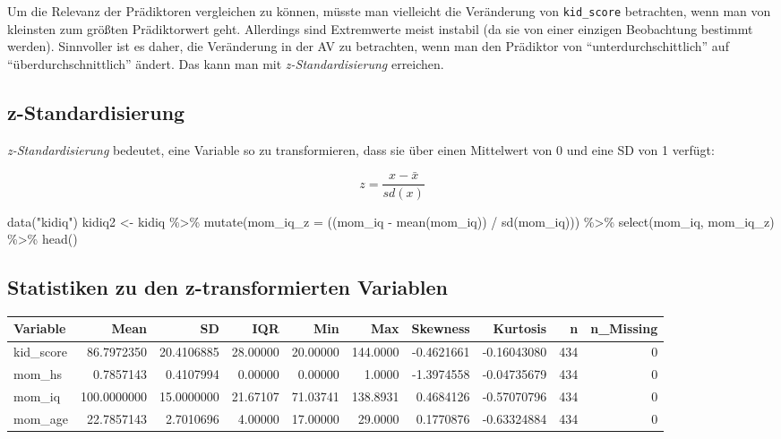\documentclass[
  a4paper,
  DIV=11]{scrreprt}
\newenvironment{Shaded}{\begin{snugshade}}{\end{snugshade}}
\newcommand{\AttributeTok}[1]{\textcolor[rgb]{0.40,0.45,0.13}{#1}}
\newcommand{\FunctionTok}[1]{\textcolor[rgb]{0.28,0.35,0.67}{#1}}
\newcommand{\NormalTok}[1]{\textcolor[rgb]{0.00,0.23,0.31}{#1}}
\newcommand{\OtherTok}[1]{\textcolor[rgb]{0.00,0.23,0.31}{#1}}
\newcommand{\SpecialCharTok}[1]{\textcolor[rgb]{0.37,0.37,0.37}{#1}}
\newcommand{\StringTok}[1]{\textcolor[rgb]{0.13,0.47,0.30}{#1}}
\theoremstyle{definition}
\theoremstyle{remark}
\begin{document}
Um die Relevanz der Prädiktoren vergleichen zu können, müsste man
vielleicht die Veränderung von \texttt{kid\_score} betrachten, wenn man
von kleinsten zum größten Prädiktorwert geht. Allerdings sind
Extremwerte meist instabil (da sie von einer einzigen Beobachtung
bestimmt werden). Sinnvoller ist es daher, die Veränderung in der AV zu
betrachten, wenn man den Prädiktor von ``unterdurchschittlich'' auf
``überdurchschnittlich'' ändert. Das kann man mit
\emph{z-Standardisierung} erreichen.

\hypertarget{z-standardisierung}{%
\subsection{z-Standardisierung}\label{z-standardisierung}}

\emph{z-Standardisierung} bedeutet, eine Variable so zu transformieren,
dass sie über einen Mittelwert von 0 und eine SD von 1 verfügt:

\[z = \frac{x - \bar{x}}{sd(x)}\]

\begin{Shaded}
\begin{Highlighting}[]
\FunctionTok{data}\NormalTok{(}\StringTok{"kidiq"}\NormalTok{)}
\NormalTok{kidiq2 }\OtherTok{\textless{}{-}} 
\NormalTok{  kidiq }\SpecialCharTok{\%\textgreater{}\%} 
  \FunctionTok{mutate}\NormalTok{(}\AttributeTok{mom\_iq\_z =}\NormalTok{ ((mom\_iq }\SpecialCharTok{{-}} \FunctionTok{mean}\NormalTok{(mom\_iq)) }\SpecialCharTok{/} \FunctionTok{sd}\NormalTok{(mom\_iq)))  }\SpecialCharTok{\%\textgreater{}\%} 
  \FunctionTok{select}\NormalTok{(mom\_iq, mom\_iq\_z) }\SpecialCharTok{\%\textgreater{}\%} 
  \FunctionTok{head}\NormalTok{()}
\end{Highlighting}
\end{Shaded}

\hypertarget{statistiken-zu-den-z-transformierten-variablen}{%
\subsection{Statistiken zu den z-transformierten
Variablen}\label{statistiken-zu-den-z-transformierten-variablen}}

\begin{longtable}{lrrrrrrrrr}
\toprule
Variable & Mean & SD & IQR & Min & Max & Skewness & Kurtosis & n & n\_Missing \\ 
\midrule
kid\_score & 86.7972350 & 20.4106885 & 28.00000 & 20.00000 & 144.0000 & -0.4621661 & -0.16043080 & 434 & 0 \\ 
mom\_hs & 0.7857143 & 0.4107994 & 0.00000 & 0.00000 & 1.0000 & -1.3974558 & -0.04735679 & 434 & 0 \\ 
mom\_iq & 100.0000000 & 15.0000000 & 21.67107 & 71.03741 & 138.8931 & 0.4684126 & -0.57070796 & 434 & 0 \\ 
mom\_age & 22.7857143 & 2.7010696 & 4.00000 & 17.00000 & 29.0000 & 0.1770876 & -0.63324884 & 434 & 0 \\ 
\bottomrule
\end{longtable}
\end{document}
